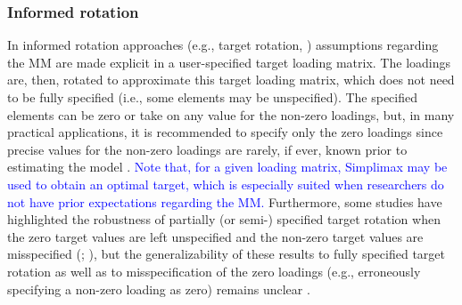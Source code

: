 \documentclass[a4paper,man,natbib]{apa6}
\begin{document}
\begin{linenumbers}

 


\subsubsection{Informed rotation}
In informed rotation approaches (e.g., target rotation, \citealp{browne2001overview}) assumptions regarding the MM are made explicit in a user-specified target loading matrix. The loadings are, then, rotated to approximate this target loading matrix, which does not need to be fully specified (i.e., some elements may be unspecified). The specified elements can be zero or take on any value for the non-zero loadings, but, in many practical applications, it is recommended to specify only the zero loadings since precise values for the non-zero loadings are rarely, if ever, known prior to estimating the model \citep{browne2001overview}. \label{refpage:R1Mj1b}\textcolor{blue}{Note that, for a given loading matrix, Simplimax \citep{kiers1994simplimax} may be used to obtain an optimal target, which is especially suited when researchers do not have prior expectations regarding the MM.} Furthermore, some studies have highlighted the robustness of partially (or semi-) specified target rotation when the zero target values are left unspecified and the non-zero target values are misspecified (\citealp{myers2013rotation}; \citealp{myers2015rotation}), but the generalizability of these results to fully specified target rotation as well as to misspecification of the zero loadings (e.g., erroneously specifying a non-zero loading as zero) remains unclear \citep{garcia2019improving}. 


\end{linenumbers}
\end{document}

